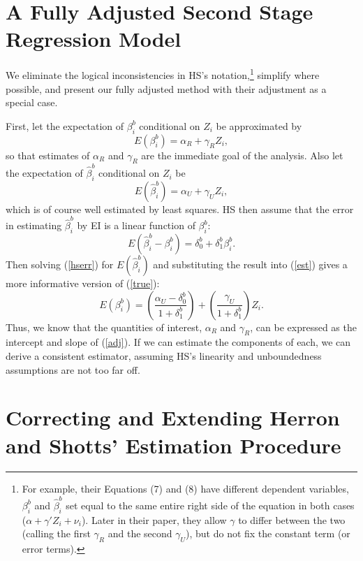 \documentclass[11pt,titlepage]{article}
\begin{document}
\section{A Fully Adjusted Second Stage Regression Model}
\label{s:fulladj}

We eliminate the logical inconsistencies in HS's
notation,\footnote{For example, their Equations (7) and (8) have
  different dependent variables, $\beta_i^b$ and $\hat\beta_i^b$ set
  equal to the same entire right side of the equation in both cases
  ($\alpha+\gamma'Z_i+\nu_i$).  Later in their paper, they allow
  $\gamma$ to differ between the two (calling the first $\gamma_R$ and
  the second $\gamma_U$), but do not fix the constant term (or error
  terms).} simplify where possible, and present our fully adjusted
method with their adjustment as a special case.  

First, let the expectation of $\beta_i^b$ conditional on $Z_i$ be
approximated by
\begin{equation}
  \label{true}
  E(\beta_i^b)=\alpha_R+\gamma_R Z_i,
\end{equation}
so that estimates of $\alpha_R$ and $\gamma_R$ are the immediate goal
of the analysis.  Also let the expectation of $\hat\beta_i^b$
conditional on $Z_i$ be
\begin{equation}
  \label{est}
  E(\hat\beta_i^b)=\alpha_U+\gamma_U Z_i,
\end{equation}
which is of course well estimated by least squares.  HS then assume
that the error in estimating $\hat\beta_i^b$ by EI is a linear
function of $\beta_i^b$:
\begin{equation}
  \label{hserr}
  E(\hat\beta_i^b - \beta_i^b)
  = \delta_0^b + \delta_1^b\beta_i^b.
\end{equation}
Then solving (\ref{hserr}) for $E(\hat\beta_i^b)$ and substituting the
result into (\ref{est}) gives a more informative version of (\ref{true}):
\begin{equation}
  \label{adj}
  E(\beta_i^b) = \left(\frac{\alpha_U-\delta_0^b}{1+\delta_1^b}\right)
  + \left(\frac{\gamma_U}{1+\delta_1^b}\right)Z_i.
\end{equation}
Thus, we know that the quantities of interest, $\alpha_R$ and
$\gamma_R$, can be expressed as the intercept and slope of
(\ref{adj}).  If we can estimate the components of each, we can derive
a consistent estimator, assuming HS's linearity and unboundedness
assumptions are not too far off.

\section{Correcting and Extending Herron and Shotts' Estimation
  Procedure}
\end{document}
